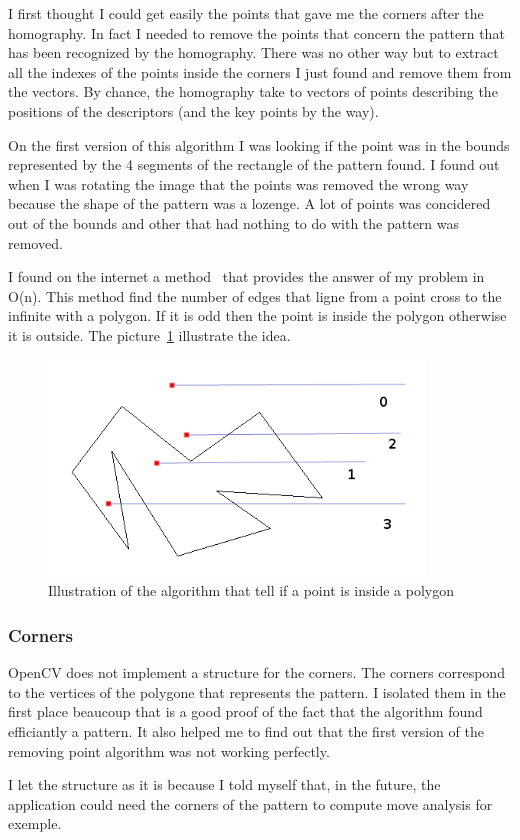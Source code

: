 	\par I first thought I could get easily the points that gave me the corners after the homography. In fact I needed to remove the points that concern the pattern that has been recognized by the homography. There was no other way but to extract all the indexes of the points inside the corners I just found and remove them from the vectors. By chance, the homography take to vectors of points describing the positions of the descriptors (and the key points by the way). 
	\par On the first version of this algorithm I was looking if the point was in the bounds represented by the 4 segments of the rectangle of the pattern found. I found out when I was rotating the image that the points was removed the wrong way because the shape of the pattern was a lozenge. A lot of points was concidered out of the bounds and other that had nothing to do with the pattern was removed.
	\par I found on the internet a method~\cite{InOut} that provides the answer of my problem in O(n). This method find the number of edges that ligne from a point cross to the infinite with a polygon. If it is odd then the point is inside the polygon otherwise it is outside. The picture~\ref{OutIn} illustrate the idea.
	\begin{figure}[h]
		\begin{center}
			\includegraphics[width=10cm]{images_not_compressed/isIn.png}
			\caption{Illustration of the algorithm that tell if a point is inside a polygon}
			\label{OutIn}	
		\end{center}
	\end{figure}
	\subsubsection{Corners}
	\par OpenCV does not implement a structure for the corners. The corners correspond to the vertices of the polygone that represents the pattern. I isolated them in the first place beaucoup that is a good proof of the fact that the algorithm found efficiantly a pattern. It also helped me to find out that the first version of the removing point algorithm was not working perfectly.
	\par I let the structure as it is because I told myself that, in the future, the application could need the corners of the pattern to compute move analysis for exemple. 	
	
